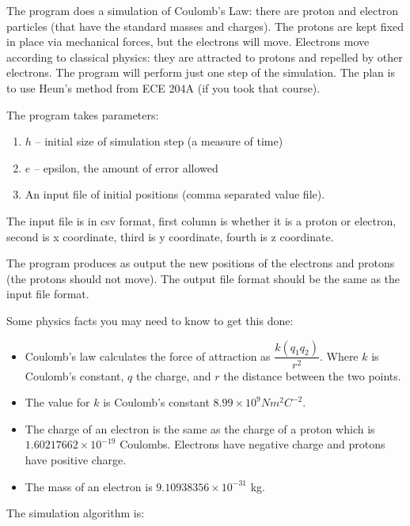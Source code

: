 \documentclass[letterpaper,10pt]{article}
\begin{document}
The program does a simulation of Coulomb's Law: there are proton and electron particles (that have the standard masses and charges). The protons are kept fixed in place via mechanical forces, but the electrons will move. Electrons move according to classical physics: they are attracted to protons and repelled by other electrons. The program will perform just one step of the simulation. The plan is to use Heun's method from ECE 204A (if you took that course).

The program takes parameters:
\begin{enumerate}
\item $h$ -- initial size of simulation step (a measure of time) 
\item $e$ -- epsilon, the amount of error allowed
\item An input file of initial positions (comma separated value file).
\end{enumerate}

The input file is in csv format, first column is whether it is a proton or electron, second is x coordinate, third is y coordinate, fourth is z coordinate.

The program produces as output the new positions of the electrons and protons (the protons should not move). The output file format should be the same as the input file format.

Some physics facts you may need to know to get this done:

\begin{itemize}
\item Coulomb's law calculates the force of attraction as $\dfrac{k (q_{1} q_{2})}{r^{2}}$.  Where $k$ is Coulomb's constant, $q$ the charge, and $r$ the distance between the two points.

\item The value for $k$ is Coulomb's constant $8.99 \times 10^{9} N m^{2} C^{-2}$. 

\item The charge of an electron is the same as the charge of a proton which is $1.60217662 \times 10^{-19}$ Coulombs. Electrons have negative charge and protons have positive charge. 

\item The mass of an electron is $9.10938356 \times 10^{-31}$ kg.
\end{itemize}


The simulation algorithm is:
\end{document}
